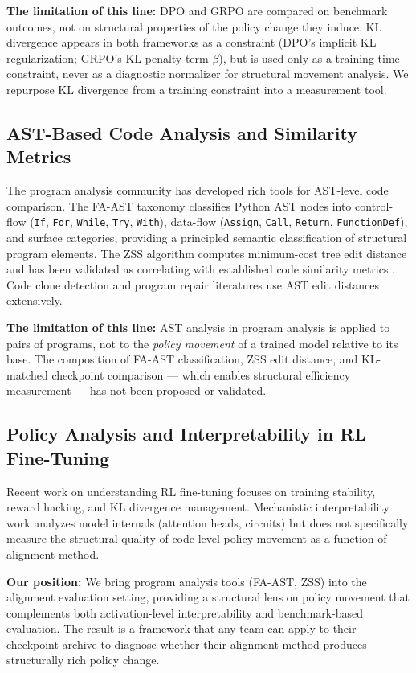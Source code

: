 \textbf{The limitation of this line:} DPO and GRPO are compared on benchmark outcomes,
not on structural properties of the policy change they induce. KL divergence
appears in both frameworks as a constraint (DPO's implicit KL regularization;
GRPO's KL penalty term $\beta$), but is used only as a training-time constraint,
never as a diagnostic normalizer for structural movement analysis. We repurpose
KL divergence from a training constraint into a measurement tool.

\subsection{AST-Based Code Analysis and Similarity Metrics}

The program analysis community has developed rich tools for AST-level code
comparison. The FA-AST taxonomy \cite{Wang2020Detecting} classifies Python AST nodes
into control-flow (\texttt{If}, \texttt{For}, \texttt{While}, \texttt{Try}, \texttt{With}), data-flow (\texttt{Assign}, \texttt{Call}, \texttt{Return},
\texttt{FunctionDef}), and surface categories, providing a principled semantic
classification of structural program elements. The ZSS algorithm \cite{Zhang1989Simple}
computes minimum-cost tree edit distance and has been validated as
correlating with established code similarity metrics \cite{Ding2024Revisiting}.
Code clone detection \cite{Svajlenko2014Towards} and program
repair \cite{Hua2018SketchFix} literatures use AST edit distances extensively.

\textbf{The limitation of this line:} AST analysis in program analysis is applied to
pairs of programs, not to the \emph{policy movement} of a trained model relative to
its base. The composition of FA-AST classification, ZSS edit distance,
and KL-matched checkpoint comparison --- which enables structural efficiency
measurement --- has not been proposed or validated.

\subsection{Policy Analysis and Interpretability in RL Fine-Tuning}

Recent work on understanding RL fine-tuning \cite{Schulman2017Proximal,Zheng2023Secrets}
focuses on training stability, reward hacking, and KL divergence management.
Mechanistic interpretability work \cite{Anthropic2023Interpretability,Elhage2022Circuits} analyzes
model internals (attention heads, circuits) but does not specifically measure
the structural quality of code-level policy movement as a function of alignment
method.

\textbf{Our position:} We bring program analysis tools (FA-AST, ZSS) into the alignment
evaluation setting, providing a structural lens on policy movement that complements
both activation-level interpretability and benchmark-based evaluation. The result
is a framework that any team can apply to their checkpoint archive to diagnose
whether their alignment method produces structurally rich policy change.
